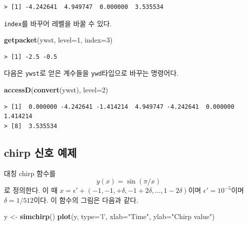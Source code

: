 \documentclass[b5paper,]{scrbook}
\makeatletter
\newenvironment{Shaded}{\begin{snugshade}}{\end{snugshade}}
\newcommand{\DataTypeTok}[1]{\textcolor[rgb]{0.13,0.29,0.53}{#1}}
\newcommand{\DecValTok}[1]{\textcolor[rgb]{0.00,0.00,0.81}{#1}}
\newcommand{\KeywordTok}[1]{\textcolor[rgb]{0.13,0.29,0.53}{\textbf{#1}}}
\newcommand{\NormalTok}[1]{#1}
\newcommand{\StringTok}[1]{\textcolor[rgb]{0.31,0.60,0.02}{#1}}
\theoremstyle{plain}
\theoremstyle{definition}
\numberwithin{equation}{section}
\newenvironment{kframe}{%
\medskip{}
\setlength{\fboxsep}{.8em}
 \def\at@end@of@kframe{}%
 \ifinner\ifhmode%
  \def\at@end@of@kframe{\end{minipage}}%
  \begin{minipage}{\columnwidth}%
 \fi\fi%
 \def\FrameCommand##1{\hskip\@totalleftmargin \hskip-\fboxsep
 \colorbox{shadecolor}{##1}\hskip-\fboxsep
     \hskip-\linewidth \hskip-\@totalleftmargin \hskip\columnwidth}%
 \MakeFramed {\advance\hsize-\width
   \@totalleftmargin\z@ \linewidth\hsize
   \@setminipage}}%
 {\par\unskip\endMakeFramed%
 \at@end@of@kframe}
\renewenvironment{Shaded}{\begin{kframe}}{\end{kframe}}
\makeatother
\begin{document}
\begin{verbatim}
> [1] -4.242641  4.949747  0.000000  3.535534
\end{verbatim}

\texttt{index}를 바꾸어 레벨을 바꿀 수 있다.

\begin{Shaded}
\begin{Highlighting}[]
\KeywordTok{getpacket}\NormalTok{(ywst, }\DataTypeTok{level=}\DecValTok{1}\NormalTok{, }\DataTypeTok{index=}\DecValTok{3}\NormalTok{)}
\end{Highlighting}
\end{Shaded}

\begin{verbatim}
> [1] -2.5 -0.5
\end{verbatim}

다음은 \texttt{ywst}로 얻은 계수들을 \texttt{ywd}타입으로 바꾸는 명령어다.

\begin{Shaded}
\begin{Highlighting}[]
\KeywordTok{accessD}\NormalTok{(}\KeywordTok{convert}\NormalTok{(ywst), }\DataTypeTok{level=}\DecValTok{2}\NormalTok{)}
\end{Highlighting}
\end{Shaded}

\begin{verbatim}
> [1]  0.000000 -4.242641 -1.414214  4.949747 -4.242641  0.000000  1.414214
> [8]  3.535534
\end{verbatim}

\hypertarget{chirp--}{%
\subsection{chirp 신호 예제}\label{chirp--}}

대칭 chirp 함수를
\[y(x)=\sin(\pi/x)\]
로 정의한다. 이 때 \(x=\epsilon ' +(-1,-1,+\delta,-1+2\delta, \ldots, 1-2\delta)\)이며 \(\epsilon ' =10^{-5}\)이며 \(\delta=1/512\)이다. 이 함수의 그림은 다음과 같다.

\begin{Shaded}
\begin{Highlighting}[]
\NormalTok{y <-}\StringTok{ }\KeywordTok{simchirp}\NormalTok{()}
\KeywordTok{plot}\NormalTok{(y, }\DataTypeTok{type=}\StringTok{'l'}\NormalTok{, }\DataTypeTok{xlab=}\StringTok{"Time"}\NormalTok{, }\DataTypeTok{ylab=}\StringTok{"Chirp value"}\NormalTok{)}
\end{Highlighting}
\end{Shaded}
\end{document}

